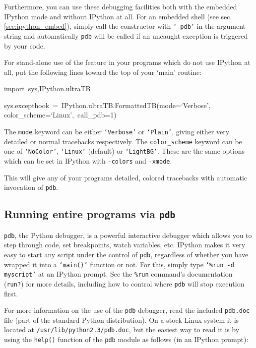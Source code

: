 Furthermore, you can use these debugging facilities both with the
embedded IPython mode and without IPython at all. For an embedded
shell (see sec. \ref{sec:ipython_embed}), simply call the constructor
with \texttt{`-pdb'} in the argument string and automatically \texttt{pdb}
will be called if an uncaught exception is triggered by your code. 

For stand-alone use of the feature in your programs which do not use
IPython at all, put the following lines toward the top of your `main'
routine:

\begin{lyxcode}
import~sys,IPython.ultraTB

sys.excepthook~=~IPython.ultraTB.FormattedTB(mode=`Verbose',~~\\
color\_scheme=`Linux',~call\_pdb=1)
\end{lyxcode}
The \texttt{mode} keyword can be either \texttt{`Verbose'} or \texttt{`Plain'},
giving either very detailed or normal tracebacks respectively. The
\texttt{color\_scheme} keyword can be one of \texttt{`NoColor'}, \texttt{`Linux'}
(default) or \texttt{`LightBG'}. These are the same options which
can be set in IPython with \texttt{-colors} and \texttt{-xmode}.

This will give any of your programs detailed, colored tracebacks with
automatic invocation of \texttt{pdb}.


\subsection{Running entire programs via \texttt{pdb}}

\texttt{pdb}, the Python debugger, is a powerful interactive debugger
which allows you to step through code, set breakpoints, watch variables,
etc. IPython makes it very easy to start any script under the control
of \texttt{pdb}, regardless of whether you have wrapped it into a
\texttt{`main()'} function or not. For this, simply type \texttt{`\%run
-d myscript'} at an IPython prompt. See the \texttt{\%run} command's
documentation (\texttt{run?}) for more details, including how to control
where \texttt{pdb} will stop execution first.

For more information on the use of the \texttt{pdb} debugger, read
the included \texttt{pdb.doc} file (part of the standard Python distribution).
On a stock Linux system it is located at \texttt{/usr/lib/python2.3/pdb.doc},
but the easiest way to read it is by using the \texttt{help()} function
of the \texttt{pdb} module as follows (in an IPython prompt):

